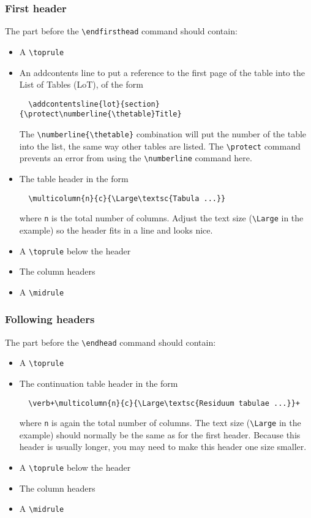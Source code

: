 \documentclass{report}
\begin{document}
\subsubsection{First header}
The part before the \verb+\endfirsthead+ command should contain:
\begin{itemize}
\item A \verb+\toprule+
\item An addcontents line to put a reference to the first page of the table
into the List of Tables (LoT), of the form
\begin{verbatim}
  \addcontentsline{lot}{section}{\protect\numberline{\thetable}Title}
\end{verbatim}
The \verb+\numberline{\thetable}+ combination will put the number of the
table into the list, the same way other tables are listed.
The \verb+\protect+ command prevents an error from using the \verb+\numberline+
command here.
\item The table header in the form
\begin{verbatim}
  \multicolumn{n}{c}{\Large\textsc{Tabula ...}}
\end{verbatim}
where \verb+n+ is the total number of columns. Adjust the text size
(\verb+\Large+ in the example) so the header fits in a line and looks nice.
\item A \verb+\toprule+ below the header
\item The column headers
\item A \verb+\midrule+
\end{itemize}

\subsubsection{Following headers}
The part before the \verb+\endhead+ command should contain:
\begin{itemize}
\item A \verb+\toprule+
\item The continuation table header in the form
\begin{verbatim}
  \verb+\multicolumn{n}{c}{\Large\textsc{Residuum tabulae ...}}+
\end{verbatim}
where \verb+n+ is again the total number of columns.
The text size
(\verb+\Large+ in the example) should normally be the same as for the first
header.
Because this header is usually longer, you may need to make this header one
size smaller.
\item A \verb+\toprule+ below the header
\item The column headers
\item A \verb+\midrule+
\end{itemize}
\end{document}
